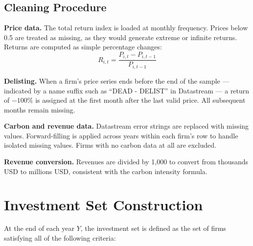 \documentclass[12pt, a4paper]{article}
\begin{document}
\subsection{Cleaning Procedure}

\textbf{Price data.} The total return index is loaded at monthly frequency. 
Prices below 0.5 are treated as missing, as they would generate extreme or 
infinite returns. Returns are computed as simple percentage changes:
\[
R_{i,t} = \frac{P_{i,t} - P_{i,t-1}}{P_{i,t-1}}
\]

\textbf{Delisting.} When a firm's price series ends before the end of the 
sample --- indicated by a name suffix such as ``DEAD - DELIST'' in Datastream 
--- a return of $-100\%$ is assigned at the first month after the last valid 
price. All subsequent months remain missing.

\textbf{Carbon and revenue data.} Datastream error strings are replaced with 
missing values. Forward-filling is applied across years within each firm's row 
to handle isolated missing values. Firms with no carbon data at all are excluded.

\textbf{Revenue conversion.} Revenues are divided by 1,000 to convert from 
thousands USD to millions USD, consistent with the carbon intensity formula.

\section{Investment Set Construction}

At the end of each year $Y$, the investment set is defined as the set of firms 
satisfying all of the following criteria:
\end{document}

